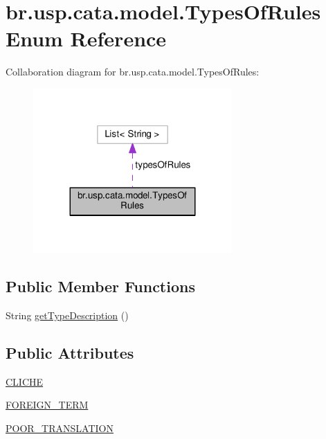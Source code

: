 \hypertarget{enumbr_1_1usp_1_1cata_1_1model_1_1_types_of_rules}{\section{br.\+usp.\+cata.\+model.\+Types\+Of\+Rules Enum Reference}
\label{enumbr_1_1usp_1_1cata_1_1model_1_1_types_of_rules}
}


Collaboration diagram for br.\+usp.\+cata.\+model.\+Types\+Of\+Rules\+:\nopagebreak
\begin{figure}[H]
\begin{center}
\leavevmode
\includegraphics[width=215pt]{enumbr_1_1usp_1_1cata_1_1model_1_1_types_of_rules__coll__graph}
\end{center}
\end{figure}
\subsection*{Public Member Functions}
\begin{DoxyCompactItemize}
\item 
String \hyperlink{enumbr_1_1usp_1_1cata_1_1model_1_1_types_of_rules_aedce385ab1cbea0c9ca4c29bdaf7a717}{get\+Type\+Description} ()
\end{DoxyCompactItemize}
\subsection*{Public Attributes}
\begin{DoxyCompactItemize}
\item 
\hyperlink{enumbr_1_1usp_1_1cata_1_1model_1_1_types_of_rules_afbb596bc9c008964f5d74ffc61c85a77}{C\+L\+I\+C\+H\+E}
\item 
\hyperlink{enumbr_1_1usp_1_1cata_1_1model_1_1_types_of_rules_ab1909f422446dc18474e847353d56062}{F\+O\+R\+E\+I\+G\+N\+\_\+\+T\+E\+R\+M}
\item 
\hyperlink{enumbr_1_1usp_1_1cata_1_1model_1_1_types_of_rules_abe0b8cf5d4626b28eb57902d54b95c40}{P\+O\+O\+R\+\_\+\+T\+R\+A\+N\+S\+L\+A\+T\+I\+O\+N}
\end{DoxyCompactItemize}
